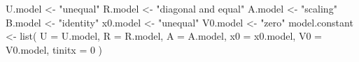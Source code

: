 \begin{Schunk}
\begin{Sinput}
 U.model <- "unequal"
 R.model <- "diagonal and equal"
 A.model <- "scaling"
 B.model <- "identity"
 x0.model <- "unequal"
 V0.model <- "zero"
 model.constant <- list(
   U = U.model, R = R.model, A = A.model,
   x0 = x0.model, V0 = V0.model, tinitx = 0
 )
\end{Sinput}
\end{Schunk}
